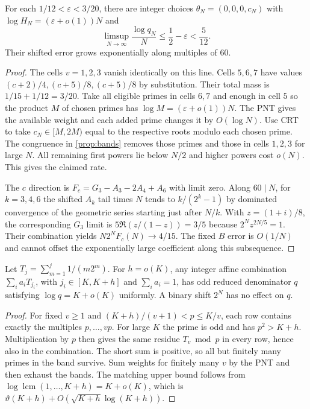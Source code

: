 \documentclass[11pt]{article}
\DeclareMathOperator{\lcm}{lcm}
\begin{document}
\begin{proposition}\label{prop:crt}
For each $1/12<\varepsilon<3/20$, there are integer choices $\theta_N=(0,0,0,c_N)$ with $\log H_N=(\varepsilon+o(1))N$ and
\[
 \limsup_{N\to\infty}\frac{\log q_N}{N}\le \frac12-\varepsilon<\frac5{12}.
\]
Their shifted error grows exponentially along multiples of $60$.
\end{proposition}
\begin{proof}
The cells $v=1,2,3$ vanish identically on this line. Cells $5,6,7$ have values $(c+2)/4,(c+5)/8,(c+5)/8$ by substitution. Their total mass is $1/15+1/12=3/20$. Take all eligible primes in cells $6,7$ and enough in cell $5$ so the product $M$ of chosen primes has $\log M=(\varepsilon+o(1))N$. The PNT gives the available weight and each added prime changes it by $O(\log N)$. Use CRT to take $c_N\in[M,2M)$ equal to the respective roots modulo each chosen prime. The congruence in \cref{prop:bands} removes those primes and those in cells $1,2,3$ for large $N$. All remaining first powers lie below $N/2$ and higher powers cost $o(N)$. This gives the claimed rate.

The $c$ direction is $F_c=G_3-A_3-2A_4+A_6$ with limit zero. Along $60\mid N$, for $k=3,4,6$ the shifted $A_k$ tail times $N$ tends to $k/(2^k-1)$ by dominated convergence of the geometric series starting just after $N/k$. With $z=(1+i)/8$, the corresponding $G_3$ limit is $5\Re(z/(1-z))=3/5$ because $2^Nz^{2N/5}=1$. Their combination yields $N2^N F_c(N)\to4/15$. The fixed $B$ error is $O(1/N)$ and cannot offset the exponentially large coefficient along this subsequence.
\end{proof}

\begin{proposition}\label{prop:near}
Let $T_j=\sum_{m=1}^j1/(m2^m)$. For $h=o(K)$, any integer affine combination $\sum_i a_i T_{j_i}$, with $j_i\in[K,K+h]$ and $\sum_i a_i=1$, has odd reduced denominator $q$ satisfying $\log q=K+o(K)$ uniformly. A binary shift $2^N$ has no effect on $q$.
\end{proposition}
\begin{proof}
For fixed $v\ge1$ and $(K+h)/(v+1)<p\le K/v$, each row contains exactly the multiples $p,\ldots,vp$. For large $K$ the prime is odd and has $p^2>K+h$. Multiplication by $p$ then gives the same residue $T_v\bmod p$ in every row, hence also in the combination. The short sum is positive, so all but finitely many primes in the band survive. Sum weights for finitely many $v$ by the PNT and then exhaust the bands. The matching upper bound follows from $\log\lcm(1,\ldots,K+h)=K+o(K)$, which is $\vartheta(K+h)+O(\sqrt{K+h}\log(K+h))$.
\end{proof}
\end{document}
